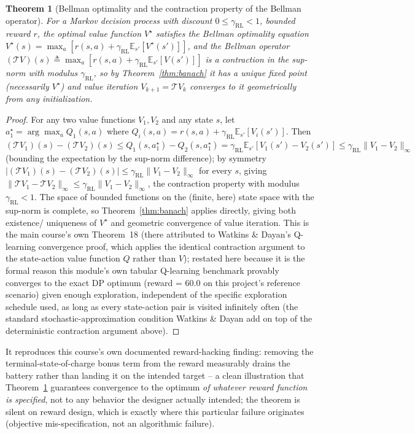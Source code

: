 \documentclass[11pt]{report}
\theoremstyle{plain}
\newtheorem{theorem}{Theorem}[chapter]
\theoremstyle{definition}
\theoremstyle{remark}
\begin{document}
\begin{theorem}[Bellman optimality and the contraction property of the Bellman operator]
\label{thm:bellman}
For a Markov decision process with discount $0\le\gamma_{\text{RL}}<1$,
bounded reward $r$, the optimal value function $V^\star$ satisfies the
Bellman optimality equation
$V^\star(s)=\max_a\left[r(s,a)+\gamma_{\text{RL}}\mathbb E_{s'}[V^\star(s')]\right]$,
and the Bellman operator $(\mathcal TV)(s)\triangleq\max_a\left[r(s,a)+
\gamma_{\text{RL}}\mathbb E_{s'}[V(s')]\right]$ is a contraction in the
sup-norm with modulus $\gamma_{\text{RL}}$, so by
Theorem~\ref{thm:banach} it has a unique fixed point (necessarily
$V^\star$) and value iteration $V_{k+1}=\mathcal TV_k$ converges to it
geometrically from any initialization.
\end{theorem}
\begin{proof}
For any two value functions $V_1,V_2$ and any state $s$, let
$a_1^\star=\arg\max_aQ_1(s,a)$ where $Q_i(s,a)=r(s,a)+
\gamma_{\text{RL}}\mathbb E_{s'}[V_i(s')]$. Then $(\mathcal
TV_1)(s)-(\mathcal TV_2)(s)\le Q_1(s,a_1^\star)-Q_2(s,a_1^\star)=
\gamma_{\text{RL}}\mathbb E_{s'}[V_1(s')-V_2(s')]\le
\gamma_{\text{RL}}\|V_1-V_2\|_\infty$ (bounding the expectation by
the sup-norm difference); by symmetry $\left|(\mathcal TV_1)(s)-(\mathcal
TV_2)(s)\right|\le\gamma_{\text{RL}}\|V_1-V_2\|_\infty$ for every $s$,
giving $\|\mathcal TV_1-\mathcal TV_2\|_\infty\le\gamma_{\text{RL}}
\|V_1-V_2\|_\infty$, the contraction property with modulus
$\gamma_{\text{RL}}<1$. The space of bounded functions on the (finite,
here) state space with the sup-norm is complete, so
Theorem~\ref{thm:banach} applies directly, giving both existence/
uniqueness of $V^\star$ and geometric convergence of value iteration.
This is the main course's own Theorem~18 (there attributed to Watkins \&
Dayan's Q-learning convergence proof, which applies the identical
contraction argument to the state-action value function $Q$ rather than
$V$); restated here because it is the formal reason this module's own
tabular Q-learning benchmark provably converges to the exact DP optimum
(reward = $60.0$ on this project's reference scenario) given enough
exploration, independent of the specific exploration schedule used, as
long as every state-action pair is visited infinitely often (the
standard stochastic-approximation condition Watkins \& Dayan add on top
of the deterministic contraction argument above).
\end{proof}

It reproduces this course's own documented reward-hacking finding:
removing the terminal-state-of-charge bonus term from the reward
measurably drains the battery rather than landing it on the intended
target -- a clean illustration that Theorem~\ref{thm:bellman} guarantees
convergence to the optimum \emph{of whatever reward function is
specified}, not to any behavior the designer actually intended; the
theorem is silent on reward design, which is exactly where this
particular failure originates (objective mis-specification, not an
algorithmic failure).
\end{document}

